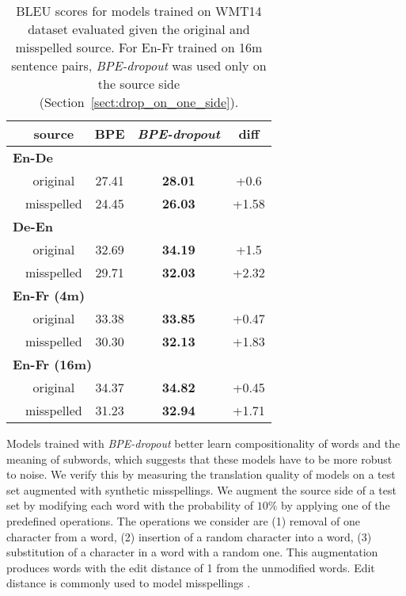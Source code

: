 \documentclass[11pt,a4paper]{article}
\begin{document}
\begin{table}[t!]
\centering
\begin{tabular}{lcccc}
\toprule
 & source & BPE & \textit{BPE-dropout} & diff\\

\midrule
\multicolumn{5}{l}{\!\!\!\bf En-De}\\
&original & 27.41 & \bf{28.01} & +0.6 \\
&misspelled & 24.45 & \bf{26.03} & +1.58\\
\midrule
\multicolumn{5}{l}{\!\!\!\bf De-En}\\
&\!\!\!\!\!\!  original & 32.69 & \bf{34.19} & +1.5\\
&\!\!\!\!\!\!  misspelled & 29.71 & \bf{32.03} & +2.32\\
\midrule
\multicolumn{5}{l}{\!\!\!\bf En-Fr (4m)}\\
&\!\!\!\!\!\!  original & 33.38 & \bf{33.85} & +0.47\\
&\!\!\!\!\!\!  misspelled & 30.30 & \bf{32.13} & +1.83 \\
\midrule
\multicolumn{5}{l}{\!\!\!\bf En-Fr (16m)}\\
&\!\!\!\!\!\!  original & 34.37 & \bf{34.82} & +0.45\\
&\!\!\!\!\!\!  misspelled & 31.23 & \bf{32.94} & +1.71 \\
\bottomrule
\end{tabular}
\caption{BLEU scores for models trained on WMT14 dataset evaluated given the original and misspelled source. For En-Fr trained on 16m sentence pairs, \textit{BPE-dropout} was used only on the source side (Section~\ref{sect:drop_on_one_side}).}
\label{tab:misspell}

\end{table}

Models trained with \textit{BPE-dropout} better learn compositionality of words and the meaning of subwords, which suggests that these models have to be more robust to noise. We verify this by measuring the translation quality of models on a test set augmented with synthetic misspellings.
We augment the source side of a test set by modifying each word with the probability of $10\%$ by applying one of the predefined operations. The operations we consider are (1) removal of one character from a word, (2) insertion of a random character into a word, (3) substitution of a character in a word with a random one. This augmentation produces words with the edit distance of 1 from the unmodified words. Edit distance is commonly used to model misspellings \cite{misspell2,misspell1,pinter-etal-2017-mimicking}.
\end{document}
